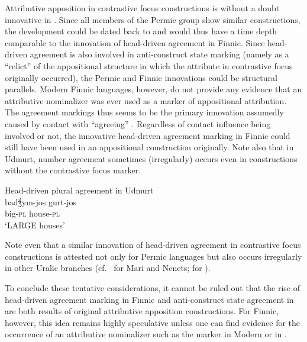 {
Attributive apposition in contrastive focus constructions is without a doubt innovative in . Since all members of the Permic group show similar constructions, the development could be dated back to  and would thus have a time depth comparable to the innovation of head\hyp{}driven agreement in Finnic. Since head\hyp{}driven agreement is also involved in  anti\hyp{}construct state marking (namely as a “relict” of the appositional structure in which the attribute in contrastive focus originally occurred), the Permic and Finnic innovations could be structural parallels. Modern Finnic languages, however, do not provide any evidence that an attributive nominalizer was ever used as a marker of appositional attribution. The agreement markings thus seems to be the primary innovation assumedly caused by contact with “agreeing” . Regardless of contact influence being involved or not, the innovative head\hyp{}driven agreement marking in Finnic could still have been used in an appositional construction originally. Note also that in Udmurt, number agreement sometimes (irregularly) occurs even in constructions without the contrastive focus marker.
\begin{exe}
\ex \rm{Head\hyp{}driven plural agreement in Udmurt \citep{winkler2001}}\\
\gll	badǯ́ym-jos gurt-jos\\
	big-\textsc{pl} house-\textsc{pl}\\
\glt	‘LARGE houses’
\end{exe}
Note even that a similar innovation of head\hyp{}driven agreement in contrastive focus constructions is attested not only for Permic languages but also occurs irregularly in other Uralic branches (cf.~\citealt[136–138, 142]{honti1997} for Mari and Nenets; \citealt[177]{siegl2013a} for ).

To conclude these tentative considerations, it cannot be ruled out that the rise of head\hyp{}driven agreement marking in Finnic and anti\hyp{}construct state agreement in  are both results of original attributive apposition constructions. For Finnic, however, this idea remains highly speculative unless one can find evidence for the occurrence of an attributive nominalizer such as the marker in Modern  or in .

}
